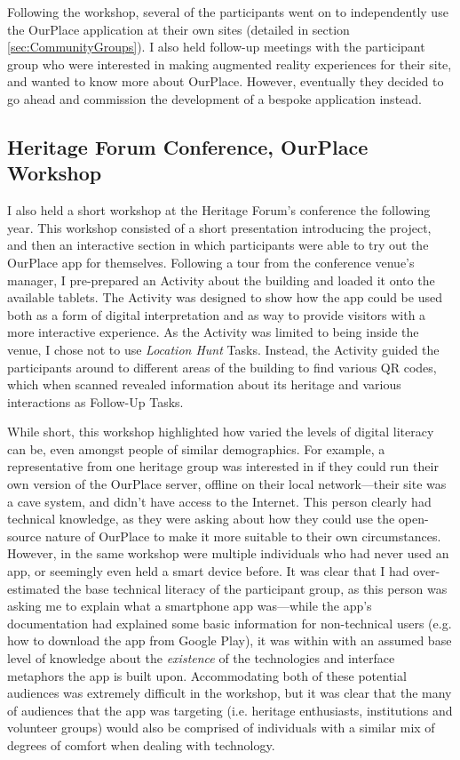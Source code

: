 Following the workshop, several of the participants went on to independently use the OurPlace application at their own sites (detailed in section \ref{sec:CommunityGroups}). I also held follow-up meetings with the participant group who were interested in making augmented reality experiences for their site, and wanted to know more about OurPlace. However, eventually they decided to go ahead and commission the development of a bespoke application instead.

\subsection{Heritage Forum Conference, OurPlace Workshop}
\label{sec:HeritageOurPlaceWorkshop}

I also held a short workshop at the Heritage Forum's conference the following year. This workshop consisted of a short presentation introducing the project, and then an interactive section in which participants were able to try out the OurPlace app for themselves. Following a tour from the conference venue's manager, I pre-prepared an Activity about the building and loaded it onto the available tablets. The Activity was designed to show how the app could be used both as a form of digital interpretation and as way to provide visitors with a more interactive experience. As the Activity was limited to being inside the venue, I chose not to use \textit{Location Hunt} Tasks. Instead, the Activity guided the participants around to different areas of the building to find various QR codes, which when scanned revealed information about its heritage and various interactions as Follow-Up Tasks.

While short, this workshop highlighted how varied the levels of digital literacy can be, even amongst people of similar demographics. For example, a representative from one heritage group was interested in if they could run their own version of the OurPlace server, offline on their local network---their site was a cave system, and didn't have access to the Internet. This person clearly had technical knowledge, as they were asking about how they could use the open-source nature of OurPlace to make it more suitable to their own circumstances. However, in the same workshop were multiple individuals who had never used an app, or seemingly even held a smart device before. It was clear that I had over-estimated the base technical literacy of the participant group, as this person was asking me to explain what a smartphone app was---while the app's documentation had explained some basic information for non-technical users (e.g. how to download the app from Google Play), it was within with an assumed base level of knowledge about the \textit{existence} of the technologies and interface metaphors the app is built upon. Accommodating both of these potential audiences was extremely difficult in the workshop, but it was clear that the many of audiences that the app was targeting (i.e. heritage enthusiasts, institutions and volunteer groups) would also be comprised of individuals with a similar mix of degrees of comfort when dealing with technology.

